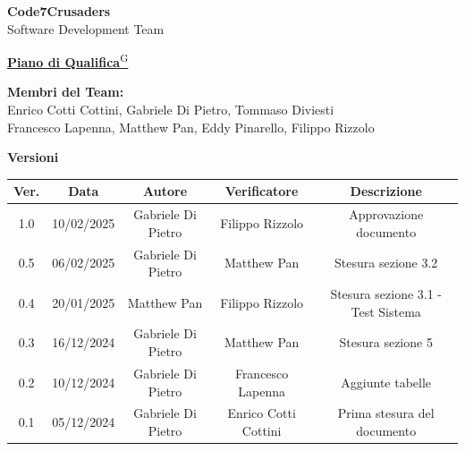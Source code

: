 \documentclass{article}
\begin{document}
\begin{titlepage}
    {\Huge \textbf{Code7Crusaders}}\\
    \vspace{0.5cm}
    {\Large Software Development Team}\\
    \vspace{2cm}
    
    {\large \href{https://code7crusaders.github.io/docs/RTB/documentazione_interna/glossario.html#piano-di-progetto}{\textbf{Piano di Qualifica}\textsuperscript{G}}}\\
    \vspace{5cm}
    
    
    \textbf{Membri del Team:}\\
    Enrico Cotti Cottini, Gabriele Di Pietro, Tommaso Diviesti \\
    Francesco Lapenna, Matthew Pan, Eddy Pinarello, Filippo Rizzolo \\
    \vspace{0.5cm}
    
    \vspace{1cm}
\end{titlepage}



\begin{table}[h!]
\centering
\textbf{Versioni} \\ %
\vspace{2mm} %
\begin{tabular}{|c|c|c|c|c|}
    \hline
    \textbf{Ver.} & \textbf{Data} & \textbf{Autore} & \textbf{Verificatore} & \textbf{Descrizione} \\
    \hline
    1.0 & 10/02/2025 & Gabriele Di Pietro & Filippo Rizzolo & Approvazione documento \\
    0.5 & 06/02/2025 & Gabriele Di Pietro & Matthew Pan & Stesura sezione 3.2 \\
    0.4 & 20/01/2025 & Matthew Pan & Filippo Rizzolo & Stesura sezione 3.1 - Test Sistema \\
    0.3 & 16/12/2024 & Gabriele Di Pietro & Matthew Pan & Stesura sezione 5 \\
    0.2 & 10/12/2024 & Gabriele Di Pietro & Francesco Lapenna & Aggiunte tabelle \\
    0.1 & 05/12/2024 & Gabriele Di Pietro & Enrico Cotti Cottini & Prima stesura del documento \\  
    \hline
\end{tabular}
\label{tab:versioni}
\end{table}
\newpage
\end{document}
